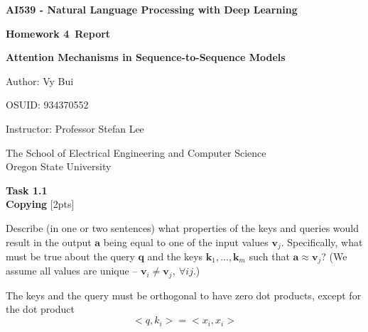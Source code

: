 \documentclass[12pt,article]{article}
\newcommand\projnumber{4}
\newenvironment{task}[2][Task]
    { \begin{mdframed}[backgroundcolor=gray!20] \textbf{#1 #2} \\}
    {  \end{mdframed}}
\begin{document}
\begin{titlepage}
    \begin{center}
        \vspace*{4cm}

        \textbf{\Large AI539 - Natural Language Processing with Deep Learning}

        \vspace{0.5cm}
 
        \textbf{ Homework \projnumber \ Report}

        \textbf{ Attention Mechanisms in Sequence-to-Sequence Models }
 
        \vspace{1cm}

        Author: Vy Bui

        OSUID: 934370552

        \vspace{1cm}

        Instructor: Professor Stefan Lee
        \vfill
             
        \vspace{0.8cm}
      
             
        The School of Electrical Engineering and Computer Science\\
        Oregon State University\\
             
    \end{center}
\end{titlepage}


%

\begin{task}{1.1} 
\textbf{Copying} [2pts]

Describe (in one or two sentences) what properties of the keys and queries would result in the output $\mathbf{a}$ being equal to one of the input values $\mathbf{v}_j$. Specifically, what must be true about the query $\mathbf{q}$ and the keys $\mathbf{k}_1, ..., \mathbf{k}_m$ such that $\mathbf{a} \approx \mathbf{v}_j$? (We assume all values are unique -- $\mathbf{v}_i \neq \mathbf{v}_j,~\forall ij$.)
\end{task}

The keys and the query must be orthogonal to have zero dot products, except for the dot product 
$$<q,k_i> = <x_i,x_i>$$
\end{document}
